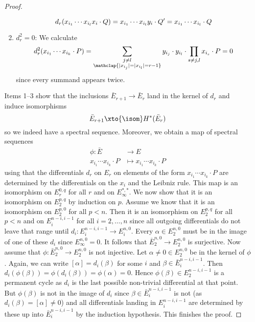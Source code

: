 \begin{proof}
\begin{enumerate}
\begin{smallproof}
				\begin{equation*}
					d_r(x_{i_1} \cdots x_{i_l} x_i \cdot Q) = x_{i_1} \cdots x_{i_l} y_i \cdot Q' = x_{i_1} \cdots x_{i_l} \cdot Q
					\qedhere
				\end{equation*}
			\end{smallproof}
		\item $d_r^2 = 0$: We calculate
			\begin{equation*}
				d_r^2(x_{i_1} \cdots x_{i_k} \cdot P) = \sum_{\substack{j \neq l \\ \mathclap{|x_{i_j}| = |x_{i_l}| = r - 1}}} y_{i_j} \cdot y_{i_l} \cdot \prod_{s \neq j, l} x_{i_s} \cdot P = 0
			\end{equation*}
			since every summand appears twice.
	\end{enumerate}
	Items 1--3 show that the inclusions $\bar{E}_{r + 1} \to \bar{E}_r$ land in the kernel of $d_r$ and induce isomorphisms
	\begin{equation*}
		\bar{E}_{r + 1} \xto{\isom} H^*(\bar{E}_r)
	\end{equation*}
	so we indeed have a spectral sequence.
	Moreover, we obtain a map of spectral sequences 
	\begin{align*}
		\phi\colon \bar{E} &\to E \\
		x_{i_1} \cdots x_{i_k} \cdot P &\mapsto x_{i_1} \cdots x_{i_k} \cdot P
	\end{align*}
	using that the differentials $d_r$ on $E_r$ on elements of the form $x_{i_1} \cdots x_{i_k} \cdot P$ are determined by the differentials on the $x_i$ and the Leibniz rule.
	This map is an isomorphism on $E_r^{0, q}$ for all $r$ and on $E_\infty^{*, *}$.
	We now show that it is an isomorphism on $E_2^{p, q}$ by induction on $p$.
	Assume we know that it is an isomorphism on $E_2^{p, 0}$ for all $p < n$. 
	Then it is an isomorphism on $E_2^{p, q}$ for all $p < n$ and on $E_i^{n - i, i - 1}$ for all $i = 2, \ldots, n$ since all outgoing differentials do not leave that range until $d_i\colon E_i^{n - i, i - 1} \to E_i^{n, 0}$.
	Every $\alpha \in E_2^{n, 0}$ must be in the image of one of these $d_i$ since $E_\infty^{n, 0} = 0$.
	It follows that $\bar{E}_2^{n, 0} \to E_2^{n, 0}$ is surjective.
	Now assume that $\phi\colon \bar{E}_2^{n, 0} \to E_2^{n, 0}$ is not injective.
	Let $\alpha \neq 0 \in E_2^{n, 0}$ be in the kernel of $\phi$.
	Again, we can write $[\alpha] = d_i(\beta)$ for some $i$ and $\beta \in \bar{E}_i^{n - i, i - 1}$.
	Then $d_i(\phi(\beta)) = \phi(d_i(\beta)) = \phi(\alpha) = 0$.
	Hence $\phi(\beta) \in E_2^{n - i, i - 1}$ is a permanent cycle as $d_i$ is the last possible non-trivial differential at that point.
	But $\phi(\beta)$ is not in the image of $d_i$ since $\beta \in \bar{E}_i^{n - i, i - 1}$ is not (as $d_i(\beta) = [\alpha] \neq 0$) and all differentials landing in $E_i^{n - i, i - 1}$ are determined by these up into $\bar{E}_i^{n - i, i - 1}$ by the induction hypothesis.
	This finishes the proof.
\end{proof}

